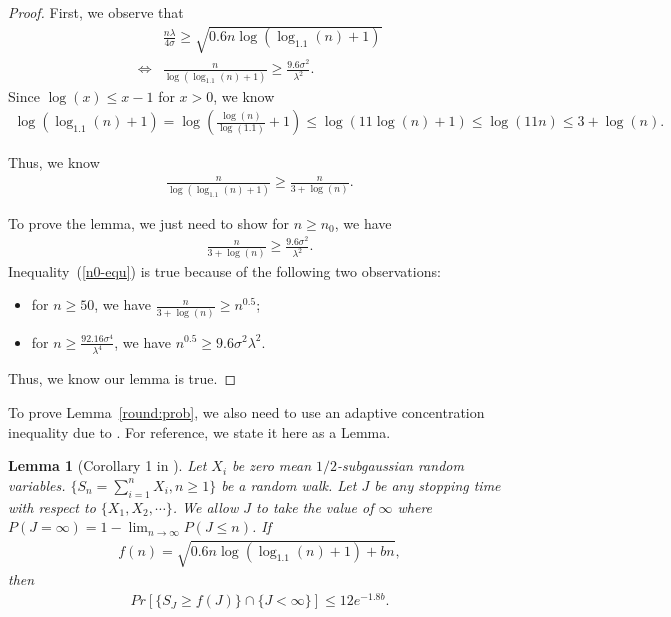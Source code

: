 \documentclass{article}
\newtheorem{lemma}{Lemma}
\begin{document}
\begin{proof}
First, we observe that
\begin{align}
&\frac{n\lambda}{4\sigma}\geq \sqrt{0.6n\log(\log_{1.1}(n)+1)} \nonumber \\
\iff &\frac{n}{\log(\log_{1.1}(n)+1)}\geq \frac{9.6\sigma^2}{\lambda^2}. \nonumber 
\end{align}
Since $\log(x)\leq x-1$ for $x>0$, we know 
\begin{align}
\log(\log_{1.1}(n)+1)=\log\left(\frac{\log(n)}{\log(1.1)}+1\right)\leq \log(11\log(n)+1)\leq \log(11n)\leq 3+\log(n). \nonumber
\end{align}

Thus, we know
\begin{align}
\frac{n}{\log(\log_{1.1}(n)+1)}\geq \frac{n}{3+\log(n)}. \nonumber 
\end{align}

To prove the lemma, we just need to show for $n\geq n_{0}$, we have
\begin{align}
\frac{n}{3+\log(n)}\geq \frac{9.6\sigma^2}{\lambda^2}. \label{n0-equ}
\end{align}
Inequality~(\ref{n0-equ}) is true because of the following two observations:
\begin{itemize}
\item for $n\geq 50$, we have $\frac{n}{3+\log(n)}\geq n^{0.5}$;
\item for $n\geq \frac{92.16\sigma^4}{\lambda^4}$, we have $n^{0.5}\geq {9.6\sigma^{2}}{\lambda^{2}}$.
\end{itemize}

Thus, we know our lemma is true.

\end{proof}

To prove Lemma~\ref{round:prob}, we also need to use an adaptive concentration inequality due to \cite{zhao2016adaptive}. For reference, we state it here as a Lemma.

\begin{lemma}[Corollary 1 in \cite{zhao2016adaptive}]
Let $X_{i}$ be zero mean $1/2$-subgaussian random variables. $\{S_{n}=\sum_{i=1}^{n}X_{i},n\geq 1\}$ be a random walk. Let $J$ be any stopping time with respect to $\{X_1,X_2,\cdots\}$. We allow $J$ to take the value of $\infty$ where $P(J=\infty)=1-\lim_{n\rightarrow \infty}P(J\leq n)$. If
\begin{align}
f(n)=\sqrt{0.6n\log(\log_{1.1}(n)+1)+bn}, \nonumber
\end{align}
then
\begin{align}
Pr[\{S_{J}\geq f(J)\}\cap \{J<\infty\}]\leq 12e^{-1.8b}. \nonumber
\end{align}
\label{ACI-inequality}
\end{lemma}
\end{document}
